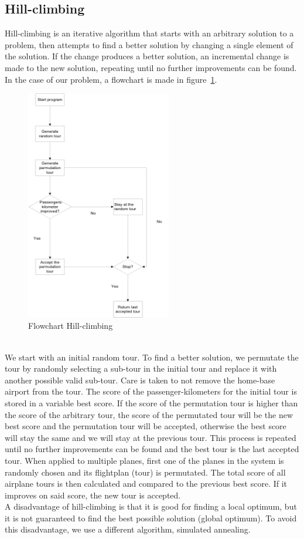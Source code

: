 \documentclass[journal]{IEEEtran}
\begin{document}
\subsection{Hill-climbing}
Hill-climbing is an iterative algorithm that starts with an arbitrary solution to a problem, then attempts to find a better solution by changing a single element of the solution. If the change produces a better solution, an incremental change is made to the new solution, repeating until no further improvements can be found.\\
In the case of our problem, a flowchart is made in figure~\ref{fig:flowchart_hc}.\\
\begin{figure}[!h]
\centering
\includegraphics[width=2.5in]{flowchart_hc}
\caption{Flowchart Hill-climbing}
\label{fig:flowchart_hc}
\end{figure}
\\
We start with an initial random tour. To find a better solution, we permutate the tour by randomly selecting a sub-tour in the initial tour and replace it with another possible valid sub-tour. Care is taken to not remove the home-base airport from the tour. The score of the passenger-kilometers for the initial tour is stored in a variable best score. If the score of the permutation tour is higher than the score of the arbitrary tour, the score of the permutated tour will be the new best score and the permutation tour will be accepted, otherwise the best score will stay the same and we will stay at the previous tour. This process is repeated until no further improvements can be found and the best tour is the last accepted tour. When applied to multiple planes, first one of the planes in the system is randomly chosen and its flightplan (tour) is permutated. The total score of all airplane tours is then calculated and compared to the previous best score. If it improves on said score, the new tour is accepted.\\
A disadvantage of hill-climbing is that it is good for finding a local optimum, but it is not guaranteed to find the best possible solution (global optimum). To avoid this disadvantage, we use a different algorithm, simulated annealing. \\
\end{document}
